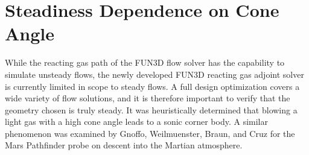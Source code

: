 \section{Steadiness Dependence on Cone Angle}

While the reacting gas path of the FUN3D flow solver has the capability to
simulate unsteady flows, the newly developed FUN3D reacting gas adjoint solver
is currently limited in scope to steady flows.  A full design optimization
covers a wide variety of flow solutions, and it is therefore important to verify
that the geometry chosen is truly steady.  It was heuristically determined that
blowing a light gas with a high cone angle leads to a sonic corner body.  A
similar phenomenon was examined by Gnoffo, Weilmuenster, Braun, and
Cruz\cite{gnoffo1996influence} for the Mars Pathfinder probe on descent into the
Martian atmosphere.
